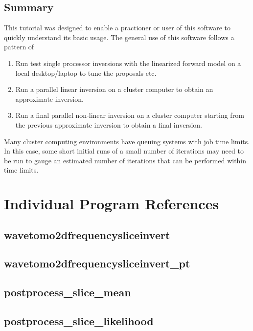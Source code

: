 \documentclass[a4paper,12pt]{article}
\begin{document}
\subsection{Summary}

This tutorial was designed to enable a practioner or user of this
software to quickly understand its basic usage. The general use of
this software follows a pattern of

\begin{enumerate}
\item Run test single processor inversions with the linearized forward
  model on a local desktop/laptop to tune the proposals etc.
\item Run a parallel linear inversion on a cluster computer to obtain
  an approximate inversion.
\item Run a final parallel non-linear inversion on a cluster computer
  starting from the previous approximate inversion to obtain a final inversion.
\end{enumerate}

Many cluster computing environments have queuing systems with job
time limits. In this case, some short initial runs of a small number of
iterations may need to be run to gauge an estimated number of iterations
that can be performed within time limits.

\section{Individual Program References}

\subsection{wavetomo2dfrequencysliceinvert}

\subsection{wavetomo2dfrequencysliceinvert\_pt}

\subsection{postprocess\_slice\_mean}

\subsection{postprocess\_slice\_likelihood}

\appendix
\end{document}
